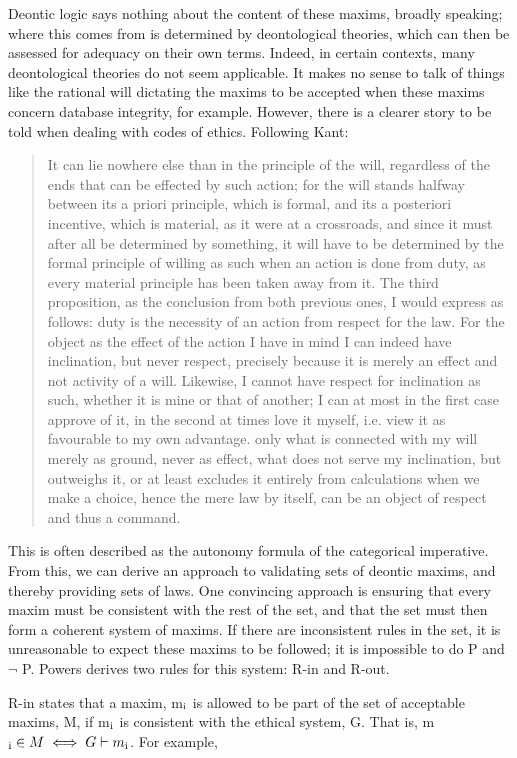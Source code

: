 \documentclass{l4proj}
\begin{document}
Deontic logic says nothing about the content of these maxims, broadly speaking; where this comes from is determined by deontological theories, which can then be assessed for adequacy on their own terms. Indeed, in certain contexts, many deontological theories do not seem applicable. It makes no sense to talk of things like the rational will dictating the maxims to be accepted when these maxims concern database integrity, for example. However, there is a clearer story to be told when dealing with codes of ethics. Following Kant\cite{groundwork}: 

\blockquote{It can lie nowhere else than in the principle of the will, regardless of the ends that can be effected by such action; for the will stands halfway between its a priori principle, which is formal, and its a posteriori incentive, which is material, as it were at a crossroads, and since it must after all be determined by something, it will have to be determined by the formal principle of willing as such when an action is done from duty, as every material principle has been taken away from it. The third proposition, as the conclusion from both previous ones, I would express as follows: duty is the necessity of an action from respect for the law. For the object as the effect of the action I have in mind I can indeed have inclination, but never respect, precisely because it is merely an effect and not activity of a will. Likewise, I cannot have respect for inclination as such, whether it is mine or that of another; I can at most in the first case approve of it, in the second at times love it myself, i.e. view it as favourable to my own advantage. only what is connected with my will merely as ground, never as effect, what does not serve my inclination, but outweighs it, or at least excludes it entirely from calculations when we make a choice, hence the mere law by itself, can be an object of respect and thus a command.}

This is often described as the autonomy formula of the categorical imperative. From this, we can derive an approach to validating sets of deontic maxims, and thereby providing sets of laws. One convincing approach is ensuring that every maxim must be consistent with the rest of the set, and that the set must then form a coherent system of maxims\cite{Powers}. If there are inconsistent rules in the set, it is unreasonable to expect these maxims to be followed; it is impossible to do P and \( \neg \) P. Powers derives two rules for this system: R-in and R-out. 

R-in states that a maxim, m\( \textsubscript{i} \) is allowed to be part of the set of acceptable maxims, M, if m\( \textsubscript{i} \) is consistent with the ethical system, G. That is, m\( \textsubscript{i}  \in M \iff G \vdash m \textsubscript{i} \). For example, %
\end{document}
